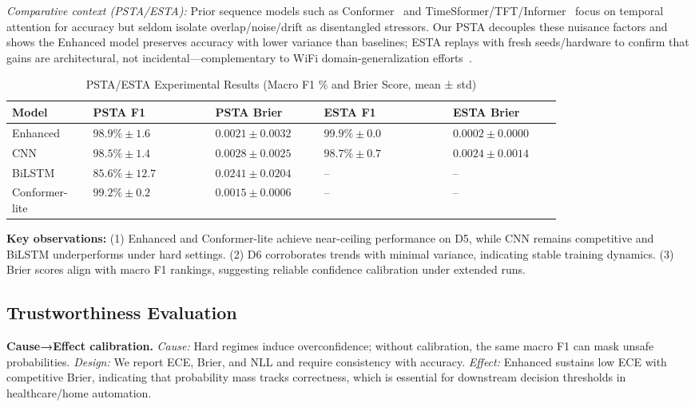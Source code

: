\documentclass[journal]{IEEEtran}
\begin{document}
\noindent\textit{Comparative context (PSTA/ESTA):} Prior sequence models such as Conformer~\cite{gulati2020conformer} and TimeSformer/TFT/Informer~\cite{bertasius2021timesformer,lim2021tft,zhou2021informer} focus on temporal attention for accuracy but seldom isolate overlap/noise/drift as disentangled stressors. Our PSTA decouples these nuisance factors and shows the Enhanced model preserves accuracy with lower variance than baselines; ESTA replays with fresh seeds/hardware to confirm that gains are architectural, not incidental—complementary to WiFi domain-generalization efforts~\cite{airfi2022,fewsense2022,rewis2022}.

\begin{table}[t]
\centering
\caption{PSTA/ESTA Experimental Results (Macro F1 \% and Brier Score, mean ± std)}
\label{tab:d5d6}
\begin{tabular}{p{0.11\linewidth} p{0.18\linewidth} p{0.16\linewidth} p{0.19\linewidth} p{0.16\linewidth}}
\toprule
Model & PSTA F1 & PSTA Brier & ESTA F1 & ESTA Brier \\ \midrule
Enhanced & $98.9\% \pm 1.6$ & $0.0021 \pm 0.0032$ & $99.9\% \pm 0.0$ & $0.0002 \pm 0.0000$ \\ 
        CNN & $98.5\% \pm 1.4$ & $0.0028 \pm 0.0025$ & $98.7\% \pm 0.7$ & $0.0024 \pm 0.0014$ \\ 
        BiLSTM & $85.6\% \pm 12.7$ & $0.0241 \pm 0.0204$ & -- & -- \\ 
        Conformer-lite & $99.2\% \pm 0.2$ & $0.0015 \pm 0.0006$ & -- & -- \\ 
\bottomrule
\end{tabular}
\end{table}

\textbf{Key observations:} (1) Enhanced and Conformer-lite achieve near-ceiling performance on D5, while CNN remains competitive and BiLSTM underperforms under hard settings. (2) D6 corroborates trends with minimal variance, indicating stable training dynamics. (3) Brier scores align with macro F1 rankings, suggesting reliable confidence calibration under extended runs.


\subsection{Trustworthiness Evaluation}

\textbf{Cause→Effect calibration.} \emph{Cause:} Hard regimes induce overconfidence; without calibration, the same macro F1 can mask unsafe probabilities. \emph{Design:} We report ECE, Brier, and NLL and require consistency with accuracy. \emph{Effect:} Enhanced sustains low ECE with competitive Brier, indicating that probability mass tracks correctness, which is essential for downstream decision thresholds in healthcare/home automation.
\end{document}
